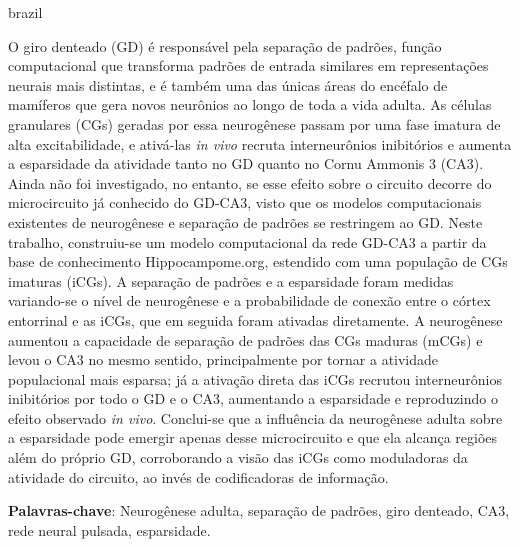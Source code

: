 \setlength{\absparsep}{18pt} %

\begin{resumo}[Resumo]
\begin{otherlanguage*}{brazil}

O giro denteado (GD) é responsável pela separação de padrões, função computacional que transforma padrões de entrada similares em
representações neurais mais distintas, e é também uma das únicas áreas do encéfalo de mamíferos que gera novos neurônios ao longo
de toda a vida adulta. As células granulares (CGs) geradas por essa neurogênese passam por uma fase imatura de alta
excitabilidade, e ativá-las \textit{in vivo} recruta interneurônios inibitórios e aumenta a esparsidade da atividade tanto no GD
quanto no Cornu Ammonis 3 (CA3). Ainda não foi investigado, no entanto, se esse efeito sobre o circuito decorre do microcircuito
já conhecido do GD-CA3, visto que os modelos computacionais existentes de neurogênese e separação de padrões se restringem ao
GD\@. Neste trabalho, construiu-se um modelo computacional da rede GD-CA3 a partir da base de conhecimento Hippocampome.org,
estendido com uma população de CGs imaturas (iCGs). A separação de padrões e a esparsidade foram medidas variando-se o nível de
neurogênese e a probabilidade de conexão entre o córtex entorrinal e as iCGs, que em seguida foram ativadas diretamente. A
neurogênese aumentou a capacidade de separação de padrões das CGs maduras (mCGs) e levou o CA3 no mesmo sentido, principalmente
por tornar a atividade populacional mais esparsa; já a ativação direta das iCGs recrutou interneurônios inibitórios por todo o GD
e o CA3, aumentando a esparsidade e reproduzindo o efeito observado \textit{in vivo}. Conclui-se que a influência da neurogênese
adulta sobre a esparsidade pode emergir apenas desse microcircuito e que ela alcança regiões além do próprio GD, corroborando a
visão das iCGs como moduladoras da atividade do circuito, ao invés de codificadoras de informação.

\noindent\textbf{Palavras-chave}: Neurogênese adulta, separação de padrões, giro denteado, CA3, rede neural pulsada, esparsidade.
\end{otherlanguage*}
\end{resumo}

